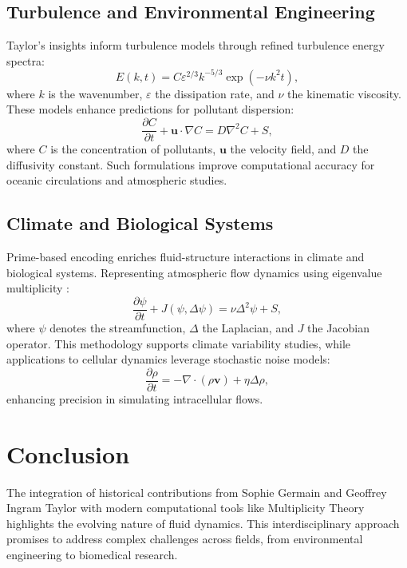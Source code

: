 \documentclass{article}
\theoremstyle{plain}
\begin{document}
\subsection{Turbulence and Environmental Engineering}
Taylor's insights inform turbulence models through refined turbulence energy spectra:
\begin{equation}
E(k, t) = C \varepsilon^{2/3} k^{-5/3} \exp\left(-\nu k^2 t\right),
\end{equation}
where $k$ is the wavenumber, $\varepsilon$ the dissipation rate, and $\nu$ the kinematic viscosity. These models enhance predictions for pollutant dispersion:
\begin{equation}
\frac{\partial C}{\partial t} + \bm{u} \cdot \nabla C = D \nabla^2 C + S,
\end{equation}
where $C$ is the concentration of pollutants, $\bm{u}$ the velocity field, and $D$ the diffusivity constant. Such formulations improve computational accuracy for oceanic circulations and atmospheric studies.

\subsection{Climate and Biological Systems}
Prime-based encoding enriches fluid-structure interactions in climate and biological systems. Representing atmospheric flow dynamics using eigenvalue multiplicity \cite{taylor1935spectrum}:
\begin{equation}
\frac{\partial \psi}{\partial t} + J(\psi, \Delta \psi) = \nu \Delta^2 \psi + S,
\end{equation}
where $\psi$ denotes the streamfunction, $\Delta$ the Laplacian, and $J$ the Jacobian operator. This methodology supports climate variability studies, while applications to cellular dynamics leverage stochastic noise models:
\begin{equation}
\frac{\partial \rho}{\partial t} = -\nabla \cdot (\rho \bm{v}) + \eta \Delta \rho,
\end{equation}
enhancing precision in simulating intracellular flows.

\section{Conclusion}
The integration of historical contributions from Sophie Germain and Geoffrey Ingram Taylor with modern computational tools like Multiplicity Theory highlights the evolving nature of fluid dynamics. This interdisciplinary approach promises to address complex challenges across fields, from environmental engineering to biomedical research.



\end{document}
